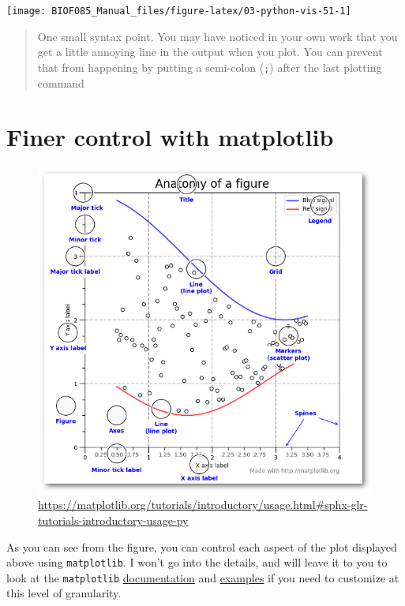 \documentclass[
  letterpaper,
]{scrbook}
\begin{document}
\begin{center}\texttt{[image: BIOF085\_Manual\_files/figure-latex/03-python-vis-51-1]} \end{center}

\begin{quote}
One small syntax point. You may have noticed in your own work that you get a little annoying line in the output when you plot. You can prevent that from happening by putting a semi-colon (\texttt{;}) after the last plotting command
\end{quote}

\hypertarget{finer-control-with-matplotlib}{%
\section{Finer control with matplotlib}\label{finer-control-with-matplotlib}}

\begin{figure}
\centering
\includegraphics{graphs/matplotlib-anatomy.png}
\caption{\url{https://matplotlib.org/tutorials/introductory/usage.html\#sphx-glr-tutorials-introductory-usage-py}}
\end{figure}

As you can see from the figure, you can control each aspect of the plot displayed above using \texttt{matplotlib}. I won't go into the details, and will leave it to you to look at the \texttt{matplotlib} \href{https://matplotlib.org/contents.html}{documentation} and \href{https://matplotlib.org/gallery/index.html}{examples} if you need to customize at this level of granularity.
\end{document}
